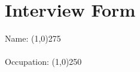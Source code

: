 \documentclass[12pt]{article}
\begin{document}
\section*{Interview Form}

Name: \line(1,0){275} \\
\\
Occupation: \line(1,0){250}
\\
\end{document}
